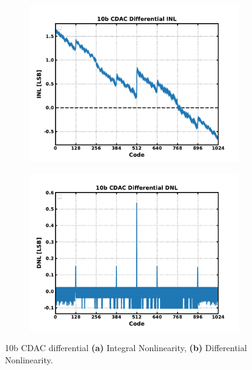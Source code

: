 	\begin{figure}[htb!]
	    \centering
	    \begin{subfigure}{0.5\textwidth}
	        \centering
	        \includegraphics[width=1\textwidth, angle=0]{./figs/results/10b_cdac_diff_inl}
	        \caption{ }
	        \label{fig:10b_cdac_diff_inl}
	    \end{subfigure}%
	    \begin{subfigure}{0.5\textwidth}
	        \centering
	        \includegraphics[width=1\textwidth, angle=0]{./figs/results/10b_cdac_diff_dnl}
	        \caption{ }
	        \label{fig:10b_cdac_diff_dnl}
	    \end{subfigure}
	    \label{fig:10b_cdac_diff_nonlinearity}
	    \caption{10b CDAC differential \textbf{(a)} Integral Nonlinearity, \textbf{(b)} Differential Nonlinearity.}
	\end{figure} 

